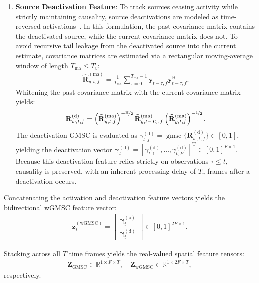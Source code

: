 \documentclass[lettersize,journal]{IEEEtran}
\begin{document}
\begin{enumerate}
  \item \textbf{Source Deactivation Feature}: To track sources ceasing activity while strictly maintaining causality, source deactivations are modeled as time-reversed activations~\cite{gode2026dnnbased}. In this formulation, the past covariance matrix contains the deactivated source, while the current covariance matrix does not. To avoid recursive tail leakage from the deactivated source into the current estimate, covariance matrices are estimated via a rectangular moving-average window of length $T_{\mathrm{ma}} \le T_v$:
  \begin{align}
    \widehat{\mathbf{R}}_{y,t,f}^{(\mathrm{ma})} = \frac{1}{T_{\mathrm{ma}}} \sum_{\tau=0}^{T_{\mathrm{ma}}-1} \mathbf{y}_{t-\tau,f} \mathbf{y}_{t-\tau,f}^{\mathrm{H}}.
    \label{eq:cov_est_ma}
  \end{align}
  Whitening the past covariance matrix with the current covariance matrix yields:
  \begin{align}
    \mathbf{R}_{w,t,f}^{(\mathrm{d})} = \left(\widehat{\mathbf{R}}_{y,t,f}^{(\mathrm{ma})}\right)^{-\nicefrac{\mathrm{H}}{2}} \widehat{\mathbf{R}}_{y,t-T_v,f}^{(\mathrm{ma})} \left(\widehat{\mathbf{R}}_{y,t,f}^{(\mathrm{ma})}\right)^{-\nicefrac{1}{2}}.
    \label{eq:whitening_deact}
  \end{align}
  The deactivation \gls{GMSC} is evaluated as $\gamma_{t,f}^{(\mathrm{d})} = \operatorname{gmsc}\{\mathbf{R}_{w,t,f}^{(\mathrm{d})}\} \in [0, 1]$, yielding the deactivation vector $\bm{\gamma}_{t}^{(\mathrm{d})} = [\gamma_{t,1}^{(\mathrm{d})}, \dots, \gamma_{t,F}^{(\mathrm{d})}]^{\mathrm{T}} \in [0, 1]^{F \times 1}$. Because this deactivation feature relies strictly on observations $\tau \le t$, causality is preserved, with an inherent processing delay of $T_v$ frames after a deactivation occurs.
\end{enumerate}
Concatenating the activation and deactivation feature vectors yields the bidirectional \gls{wGMSC} feature vector:
\begin{align}
  \mathbf{z}_{t}^{(\mathrm{wGMSC})} = \begin{bmatrix} \bm{\gamma}_{t}^{(\mathrm{a})} \\ \bm{\gamma}_{t}^{(\mathrm{d})} \end{bmatrix} \in [0, 1]^{2F \times 1}.
  \label{eq:feat_wgmsc_vec}
\end{align}

Stacking across all $T$ time frames yields the real-valued spatial feature tensors:
\begin{align}
  \mathbf{Z}_{\mathrm{GMSC}} \in \mathbb{R}^{1 \times F \times T}, \quad \mathbf{Z}_{\mathrm{wGMSC}} \in \mathbb{R}^{1 \times 2F \times T},
  \label{eq:feat_gmsc_tensors}
\end{align}
respectively.
\end{document}
